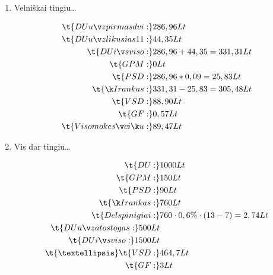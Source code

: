 \begin{enumerate}
  \item Velniškai tingiu…

    \begin{align*}
      \t{DU už pirmas dvi:} & 286,96 Lt \\
      \t{DU už likusias 11:} & 44,35 Lt \\
      \t{DU iš viso:} & 286,96 + 44,35 = 331,31 Lt \\
      \t{GPM:} & 0 Lt \\
      \t{PSD:} & 286,96 * 0,09 = 25,83 Lt \\
      \t{Į rankas:} & 331,31 - 25,83 = 305,48 Lt \\
      \t{VSD:} & 88,90 Lt \\
      \t{GF:} & 0,57 Lt \\
      \t{Viso mokesčių:} & 89,47 Lt \\
    \end{align*}
    
  \item Vis dar tingiu…

    \begin{align*}
      \t{DU:} & 1000 Lt \\
      \t{GPM:} & 150 Lt \\
      \t{PSD:} & 90 Lt \\
      \t{Į rankas:} & 760 Lt \\
      \t{Delspinigiai:} & 760 \cdot 0,6 \% \cdot (13 - 7) = 2,74 Lt \\
      \t{DU už atostogas:} 500 Lt \\
      \t{DU iš viso:} 1500 Lt \\
      \t{…}
      \t{VSD:} & 464,7 Lt \\
      \t{GF:} & 3 Lt \\
    \end{align*}

\end{enumerate}
